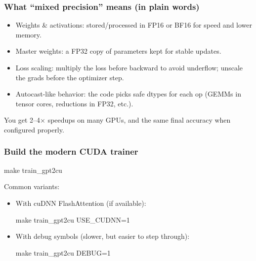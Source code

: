 \documentclass[
  letterpaper,
  DIV=11,
  numbers=noendperiod]{scrreprt}
\newenvironment{Shaded}{\begin{snugshade}}{\end{snugshade}}
\newcommand{\FunctionTok}[1]{\textcolor[rgb]{0.28,0.35,0.67}{#1}}
\newcommand{\NormalTok}[1]{\textcolor[rgb]{0.00,0.23,0.31}{#1}}
\providecommand{\tightlist}{%
  \setlength{\itemsep}{0pt}\setlength{\parskip}{0pt}}
\begin{document}
\subsubsection{What ``mixed precision'' means (in plain
words)}\label{what-mixed-precision-means-in-plain-words}

\begin{itemize}
\tightlist
\item
  Weights \& activations: stored/processed in FP16 or BF16 for speed and
  lower memory.
\item
  Master weights: a FP32 copy of parameters kept for stable updates.
\item
  Loss scaling: multiply the loss before backward to avoid underflow;
  unscale the grads before the optimizer step.
\item
  Autocast-like behavior: the code picks safe dtypes for each op (GEMMs
  in tensor cores, reductions in FP32, etc.).
\end{itemize}

You get 2--4× speedups on many GPUs, and the same final accuracy when
configured properly.

\subsubsection{Build the modern CUDA
trainer}\label{build-the-modern-cuda-trainer}

\begin{Shaded}
\begin{Highlighting}[]
\FunctionTok{make}\NormalTok{ train\_gpt2cu}
\end{Highlighting}
\end{Shaded}

Common variants:

\begin{itemize}
\item
  With cuDNN FlashAttention (if available):

\begin{Shaded}
\begin{Highlighting}[]
\FunctionTok{make}\NormalTok{ train\_gpt2cu USE\_CUDNN=1}
\end{Highlighting}
\end{Shaded}
\item
  With debug symbols (slower, but easier to step through):

\begin{Shaded}
\begin{Highlighting}[]
\FunctionTok{make}\NormalTok{ train\_gpt2cu DEBUG=1}
\end{Highlighting}
\end{Shaded}
\end{itemize}
\end{document}
